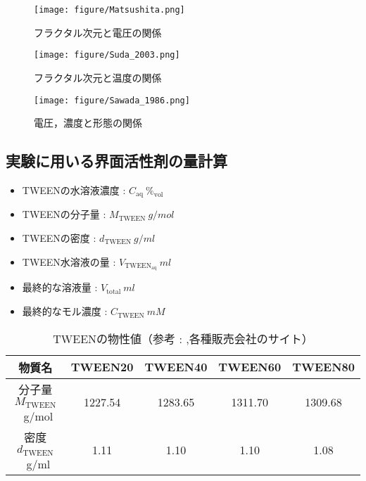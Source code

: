 \documentclass{ltjsarticle}
\begin{document}
\begin{figure}[H]
  \begin{minipage}{0.3\columnwidth}
    \centering
    \texttt{[image: figure/Matsushita.png]}
    \caption{フラクタル次元と電圧の関係\cite{matsushita1984fractal}}
    \label{fig:電圧とフラクタル次元}
  \end{minipage}
  \begin{minipage}{0.3\columnwidth}
    \centering
    \texttt{[image: figure/Suda\_2003.png]}
    \caption{フラクタル次元と温度の関係\cite{suda2003temperature}}
    \label{fig:温度とフラクタル次元}
  \end{minipage}
  \begin{minipage}{0.3\columnwidth}
    \centering
    \texttt{[image: figure/Sawada\_1986.png]}
    \caption{電圧，濃度と形態の関係\cite{sawada1986dendritic}}
    \label{fig:電圧，濃度と形態}
  \end{minipage}
\end{figure}

\subsection{実験に用いる界面活性剤の量計算}
\begin{itemize}
  \item TWEENの水溶液濃度 : $C_{\mathrm{aq}} \ \%_{\mathrm{vol}}$
  \item TWEENの分子量 : $M_{\mathrm{TWEEN}} \ \si{g/mol}$
  \item TWEENの密度 : $d_{\mathrm{TWEEN}} \ \si{g/ml}$
  \item TWEEN水溶液の量 : $V_{\mathrm{TWEEN_{aq}}} \ \si{ml}$
  \item 最終的な溶液量 : $V_{\mathrm{total}} \ \si{ml}$
  \item 最終的なモル濃度 : $C_{\mathrm{TWEEN}} \ \si{mM}$
\end{itemize}
\begin{table}[H]
  \centering
  \caption{TWEENの物性値（参考 : \cite{hait2001determination},各種販売会社のサイト）}
  \begin{tabular}{|c||c|c|c|c|}
    \hline
    物質名                                  & TWEEN20 & TWEEN40 & TWEEN60 & TWEEN80 \\
    \hline \hline
    分子量 $M_{\mathrm{TWEEN}}$\ \si{g/mol} & 1227.54 & 1283.65 & 1311.70 & 1309.68 \\
    \hline
    密度 $d_{\mathrm{TWEEN}}$\ \si{g/ml}   & 1.11    & 1.10    & 1.10    & 1.08    \\
    \hline
  \end{tabular}
\end{table}
\end{document}
